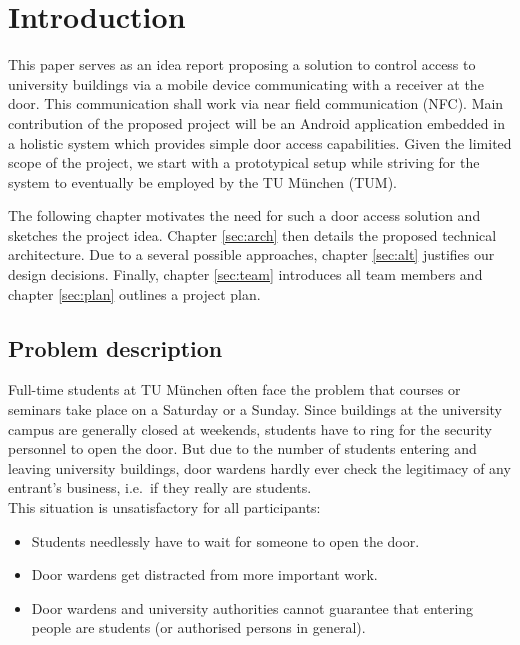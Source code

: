 \bigskip
\bigskip


\section{Introduction}

This paper serves as an idea report proposing a solution to control access to university buildings via a mobile device communicating with a receiver at the door. This communication shall work via near field communication (NFC). Main contribution of the proposed project will be an Android application embedded in a holistic system which provides simple door access capabilities. Given the limited scope of the project, we start with a prototypical setup while striving for the system to eventually be employed by the TU München (TUM).



The following chapter motivates the need for such a door access solution and sketches the project idea. Chapter \ref{sec:arch} then details the proposed technical architecture. Due to a several possible approaches, chapter \ref{sec:alt} justifies our design decisions. Finally, chapter \ref{sec:team} introduces all team members and chapter \ref{sec:plan} outlines a project plan.

\subsection{Problem description}


Full-time students at TU München often face the problem that courses or seminars take place on a Saturday or a Sunday.
Since buildings at the university campus are generally closed at weekends, students have to ring for the security personnel to open the door. But due to the number of students entering and leaving university buildings, door wardens hardly ever check the legitimacy of any entrant's business, i.e.~if they really are students.\\
This situation is unsatisfactory for all participants:

\begin{itemize}
\item Students needlessly have to wait for someone to open the door.
\item Door wardens get distracted from more important work.
\item Door wardens and university authorities cannot guarantee that entering people are students (or authorised persons in general).
\end{itemize}

